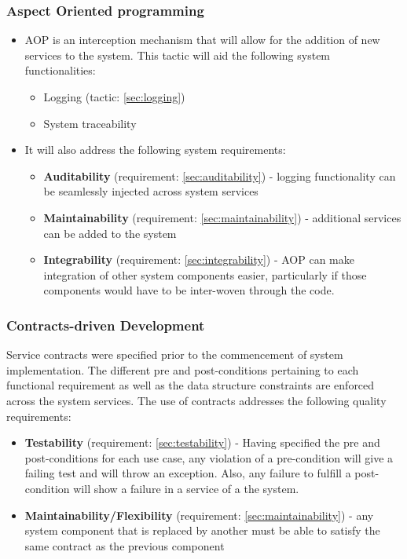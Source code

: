\subsubsection{Aspect Oriented programming} \label{sec:aop}
\begin{itemize}
		\item AOP is an interception mechanism that will allow for the addition of new services to the system.
This tactic will aid the following system functionalities:
		\begin{itemize}
			\item Logging (tactic: \ref{sec:logging})
		    \item System traceability
		\end{itemize}
\end{itemize}
\begin{itemize}
\item It will also address the following system requirements:
	\begin{itemize}
			\item \textbf{Auditability} (requirement: \ref{sec:auditability}) - logging functionality can be seamlessly injected across system services
			\item \textbf{Maintainability} (requirement: \ref{sec:maintainability}) - additional services can be added to the system
			\item \textbf{Integrability} (requirement: \ref{sec:integrability}) - AOP can make integration of other system components easier, particularly if those components would have to be inter-woven through the code.
	\end{itemize}
\end{itemize}

\subsubsection{Contracts-driven Development} \label{sec:contracts}
Service contracts were specified prior to the commencement of system implementation. The different pre and post-conditions pertaining to each functional requirement as well as the data structure constraints are enforced across the system services. The use of contracts addresses the following quality requirements:
\begin{itemize}
	\item \textbf{Testability} (requirement: \ref{sec:testability}) - Having specified the pre and post-conditions for each use case, any violation of a pre-condition will give a failing test and will throw an exception. Also, any failure to fulfill a post-condition will show a failure in a service of a the system.
	\item \textbf{Maintainability/Flexibility} (requirement: \ref{sec:maintainability}) - any system component that is replaced by another must be able to satisfy the same contract as the previous component
\end{itemize}


